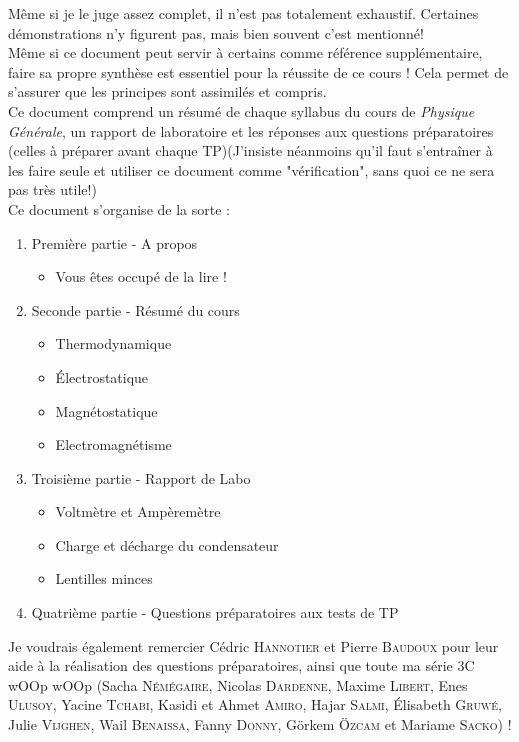 \documentclass	[11pt, a4paper, openany]{book}
\begin{document}
Même si je le juge assez complet, il n'est pas totalement exhaustif. Certaines démonstrations n'y figurent pas, mais bien souvent c'est mentionné! \\
Même si ce document peut servir à certains comme référence supplémentaire, faire sa propre synthèse est essentiel pour la réussite de ce cours ! Cela permet de s'assurer que les principes sont assimilés et compris.\\

Ce document comprend un résumé de chaque syllabus du cours de \textit{Physique Générale}, un rapport de laboratoire et les réponses aux questions préparatoires (celles à préparer avant chaque TP)(J'insiste néanmoins qu'il faut s'entraîner à les faire seule et utiliser ce document comme "vérification", sans quoi ce ne sera pas très utile!)\\ 
Ce document s'organise de la sorte :
\begin{enumerate}
\item Première partie - A propos
\begin{itemize}
\item Vous êtes occupé de la lire !
\end{itemize}
\item Seconde partie - Résumé du cours
\begin{itemize}
\item Thermodynamique
\item Électrostatique
\item Magnétostatique
\item Electromagnétisme
\end{itemize}
\item Troisième partie - Rapport de Labo
\begin{itemize}
\item Voltmètre et Ampèremètre
\item Charge et décharge du condensateur
\item Lentilles minces
\end{itemize}
\item Quatrième partie - Questions préparatoires aux tests de TP
\end{enumerate}

Je voudrais également remercier Cédric \textsc{Hannotier} et Pierre \textsc{Baudoux} pour leur aide à la réalisation des questions préparatoires, ainsi que toute ma série 3C wOOp wOOp (Sacha \textsc{Némégaire}, Nicolas \textsc{Dardenne}, Maxime \textsc{Libert}, Enes \textsc{Ulusoy}, Yacine \textsc{Tchabi}, Kasidi et Ahmet \textsc{Amiro}, Hajar \textsc{Salmi}, Élisabeth \textsc{Gruwé}, Julie \textsc{Vijghen}, Wail \textsc{Benaissa}, Fanny \textsc{Donny}, Görkem \textsc{Özcam} et Mariame \textsc{Sacko}) ! \\
\end{document}
